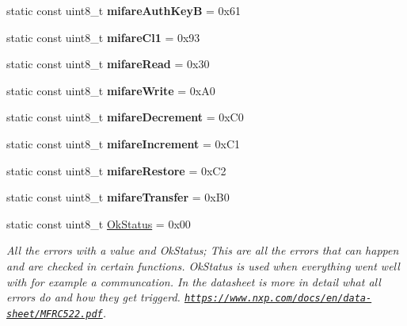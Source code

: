 \begin{DoxyCompactItemize}
static const uint8\+\_\+t {\bfseries mifare\+Auth\+KeyB} = 0x61
\item 
\mbox{\label{classMFRC522_af75c37517407aafc7dca828c40bf76bd}} 
static const uint8\+\_\+t {\bfseries mifare\+Cl1} = 0x93
\item 
\mbox{\label{classMFRC522_ab42d4cb6434ffbdb49e06beed6d3607a}} 
static const uint8\+\_\+t {\bfseries mifare\+Read} = 0x30
\item 
\mbox{\label{classMFRC522_a6f995a94e4dfea2658f40fb7f3e6411d}} 
static const uint8\+\_\+t {\bfseries mifare\+Write} = 0x\+A0
\item 
\mbox{\label{classMFRC522_a95810162f58dc2b2eda8053da4cb5dba}} 
static const uint8\+\_\+t {\bfseries mifare\+Decrement} = 0x\+C0
\item 
\mbox{\label{classMFRC522_aaa8dadd82433ee9a49d219c83a3ec7e2}} 
static const uint8\+\_\+t {\bfseries mifare\+Increment} = 0x\+C1
\item 
\mbox{\label{classMFRC522_a760f0c1337aae2febb6e9fa041ccb982}} 
static const uint8\+\_\+t {\bfseries mifare\+Restore} = 0x\+C2
\item 
\mbox{\label{classMFRC522_a83d79879810f8dc2a6bac2120a56b2af}} 
static const uint8\+\_\+t {\bfseries mifare\+Transfer} = 0x\+B0
\item 
\mbox{\label{classMFRC522_a571732f99802b33ac2a6695afa1ec7a4}} 
static const uint8\+\_\+t \hyperlink{classMFRC522_a571732f99802b33ac2a6695afa1ec7a4}{Ok\+Status} = 0x00
\begin{DoxyCompactList}\small\item\em All the errors with a value and Ok\+Status;  This are all the errors that can happen and are checked in certain functions. Ok\+Status is used when everything went well with for example a communcation. In the datasheet is more in detail what all errors do and how they get triggerd. \href{https://www.nxp.com/docs/en/data-sheet/MFRC522.pdf}{\tt https\+://www.\+nxp.\+com/docs/en/data-\/sheet/\+M\+F\+R\+C522.\+pdf}. \end{DoxyCompactList}\item 

\end{DoxyCompactItemize}
